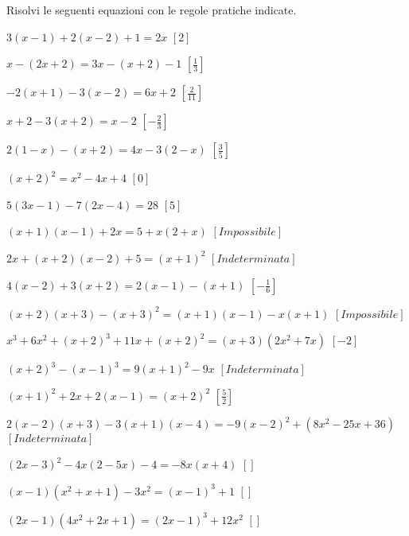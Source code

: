 \begin{esercizio}[\Ast]
\label{ese:13.14}
Risolvi le seguenti equazioni con le regole pratiche indicate.
 \begin{enumeratea}
 \item \(3(x-1)+2(x-2)+1=2x\) \hfill \(\left[2\right]\)
 \item \(x-(2x+2)=3x-(x+2)-1\) \hfill \(\left[\frac{1}{3}\right]\)
 \item \(-2(x+1)-3(x-2)=6x+2\) \hfill \(\left[\frac{2}{11}\right]\)
 \item \(x+2-3(x+2)=x-2\) \hfill \(\left[-\frac{2}{3}\right]\)
 \item \(2(1-x)-(x+2)=4x-3(2-x)\) \hfill \(\left[\frac{3}{5}\right]\)
 \item \((x+2)^{2}=x^{2}-4x+4\) \hfill \(\left[0\right]\)
 \item \(5(3x-1)-7(2x-4)=28\) \hfill \(\left[5\right]\)
 \item \((x+1)(x-1)+2x=5+x(2+x)\) \hfill \(\left[Impossibile\right]\)
 \item \(2x+(x+2)(x-2)+5=(x+1)^{2}\) \hfill \(\left[Indeterminata\right]\)
 \item \(4(x-2)+3(x+2)=2(x-1)-(x+1)\) \hfill \(\left[-\frac{1}{6}\right]\)
 \item \((x+2)(x+3)-(x+3)^{2}=(x+1)(x-1)-x(x+1)\) 
  \hfill \(\left[Impossibile\right]\)
 \item \(x^{3}+6x^{2}+(x+2)^{3}+11x+(x+2)^{2}=(x+3)\left(2x^{2}+7x\right)\) 
  \hfill \(\left[-2\right]\)
 \item \((x+2)^{3}-(x-1)^{3}=9(x+1)^{2}-9x\) \hfill \(\left[Indeterminata\right]\)
 \item \((x+1)^{2}+2x+2(x-1)=(x+2)^{2}\) \hfill \(\left[\frac{5}{2}\right]\)
 \item \(2(x-2)(x+3)-3(x+1)(x-4)=-9(x-2)^{2}+\left(8x^{2}-25x+36\right)\) 
  \hfill \(\left[Indeterminata\right]\)
 \item \((2x-3)^{2}-4x(2-5x)-4=-8x(x+4)\) \hfill \(\left[\right]\)
 \item \((x-1)\left(x^{2}+x+1\right)-3x^{2}=(x-1)^{3}+1\) \hfill \(\left[\right]\)
 \item \((2x-1)\left(4x^{2}+2x+1\right)=(2x-1)^{3}+12x^{2}\) 
  \hfill \(\left[\right]\)
 \end{enumeratea}
\end{esercizio}


